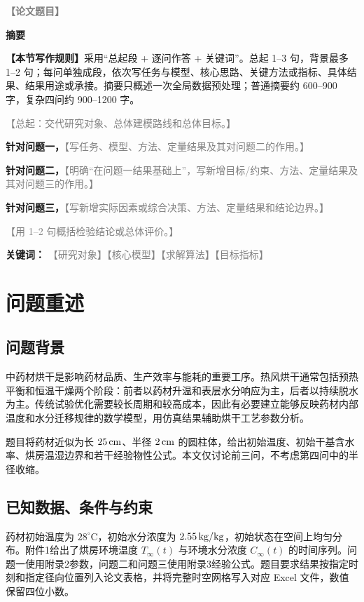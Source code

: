 \documentclass[UTF8,a4paper,12pt]{ctexart}
\numberwithin{equation}{section}
\newcommand{\writingrule}[1]{\par\noindent\begingroup\color{gray}\small\textbf{【本节写作规则】}#1\par\endgroup}
\newcommand{\placeholder}[1]{\textcolor{gray}{【#1】}}
\newif\ifqfour
\begin{document}
\begin{center}
  {\fontsize{14pt}{18pt}\selectfont\bfseries \placeholder{论文题目}}\par\vspace{10pt}
  {\fontsize{14pt}{18pt}\selectfont\bfseries 摘要}
\end{center}
\writingrule{采用“总起段 + 逐问作答 + 关键词”。总起 1--3 句，背景最多 1--2 句；每问单独成段，依次写任务与模型、核心思路、关键方法或指标、具体结果、结果用途或承接。摘要只概述一次全局数据预处理；普通摘要约 600--900 字，复杂四问约 900--1200 字。}

\noindent \placeholder{总起：交代研究对象、总体建模路线和总体目标。}

\noindent \textbf{针对问题一，}\placeholder{写任务、模型、方法、定量结果及其对问题二的作用。}

\noindent \textbf{针对问题二，}\placeholder{明确“在问题一结果基础上”，写新增目标/约束、方法、定量结果及其对问题三的作用。}

\noindent \textbf{针对问题三，}\placeholder{写新增实际因素或综合决策、方法、定量结果和结论边界。}

\ifqfour
\noindent \textbf{针对问题四，}\placeholder{写任务、模型、方法、定量结果和结果用途。}
\fi

\noindent \placeholder{用 1--2 句概括检验结论或总体评价。}\par
\noindent \textbf{关键词：} \placeholder{研究对象}\quad \placeholder{核心模型}\quad \placeholder{求解算法}\quad \placeholder{目标指标}

\section{问题重述}
\subsection{问题背景}
中药材烘干是影响药材品质、生产效率与能耗的重要工序。热风烘干通常包括预热平衡和恒温干燥两个阶段：前者以药材升温和表层水分响应为主，后者以持续脱水为主。传统试验优化需要较长周期和较高成本，因此有必要建立能够反映药材内部温度和水分迁移规律的数学模型，用仿真结果辅助烘干工艺参数分析。

题目将药材近似为长 $25\rm\,cm$、半径 $2\rm\,cm$ 的圆柱体，给出初始温度、初始干基含水率、烘房温湿边界和若干经验物性公式。本文仅讨论前三问，不考虑第四问中的半径收缩。

\subsection{已知数据、条件与约束}
药材初始温度为 $28^\circ\mathrm C$，初始水分浓度为 $2.55\rm\,kg/kg$，初始状态在空间上均匀分布。附件1给出了烘房环境温度 $T_\infty(t)$ 与环境水分浓度 $C_\infty(t)$ 的时间序列。问题一使用附录2参数，问题二和问题三使用附录3经验公式。题目要求结果按指定时刻和指定径向位置列入论文表格，并将完整时空网格写入对应 Excel 文件，数值保留四位小数。
\end{document}
